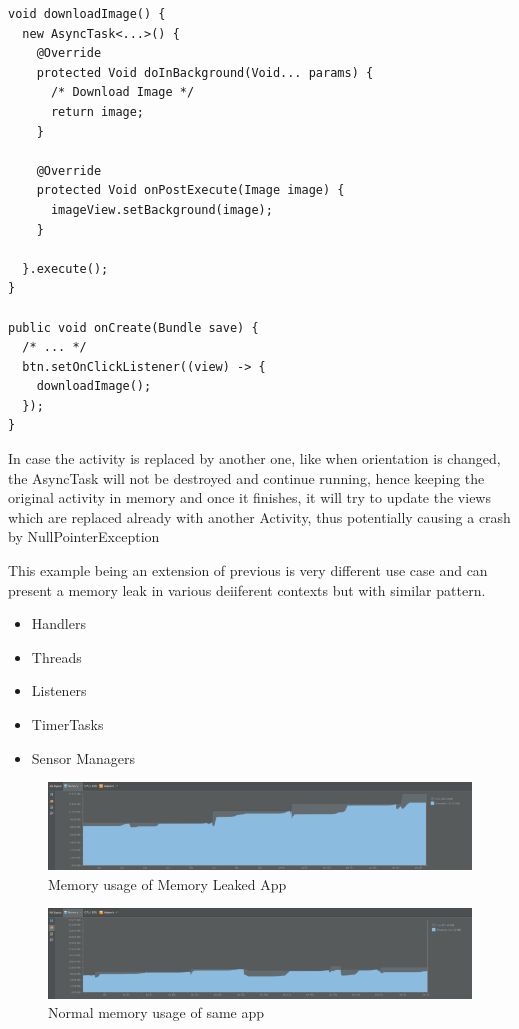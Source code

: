 \documentclass[journal]{IEEEtran}
\begin{document}
\begin{itemize}
	\newpage
\begin{verbatim}
void downloadImage() {
  new AsyncTask<...>() {
    @Override
    protected Void doInBackground(Void... params) {
      /* Download Image */
      return image;
    }
    
    @Override
    protected Void onPostExecute(Image image) {
      imageView.setBackground(image);
    }
    
  }.execute();
}

public void onCreate(Bundle save) {
  /* ... */
  btn.setOnClickListener((view) -> {
    downloadImage();
  });
}
\end{verbatim}
	In case the activity is replaced by another one, like when orientation is changed, the AsyncTask will not be destroyed and continue running, hence keeping the original activity in memory and once it finishes, it will try to update the views which are replaced already with another Activity, thus potentially causing a crash by NullPointerException
	
	This example being an extension of previous is very different use case and can present a memory leak in various deiiferent contexts but with similar pattern.
	\begin{itemize}
		\item Handlers
		\item Threads
		\item Listeners
		\item TimerTasks
		\item Sensor Managers\\
	\end{itemize}
	

\end{itemize}

\begin{figure}[h]
	\centering
	\includegraphics[width=0.7\linewidth]{memleak}
	\caption[]{Memory usage of Memory Leaked App \cite{fixing}}
	\label{fig:memleak}
\end{figure}

\begin{figure}[h]
	\centering
	\includegraphics[width=0.7\linewidth]{nomemleak}
	\caption[]{Normal memory usage of same app \cite{fixing}}
	\label{fig:nomemleak}
\end{figure}
\end{document}
